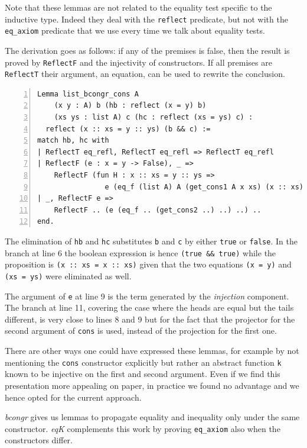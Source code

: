 \documentclass[a4paper,UKenglish,cleveref, autoref]{lipics-v2019}
\newcommand{\derive}[1]{\emph{#1}}
\begin{document}
\noindent
Note that these lemmas are not related to the
equality test specific to the inductive type. Indeed they deal
with the \lstinline+reflect+ predicate, but not with the
\lstinline+eq_axiom+ predicate that we use every time we talk
about equality tests.

The derivation goes as follows: if any of the premises
is false, then the result is proved by
\lstinline+ReflectF+ and the injectivity of constructors.
If all premises are \lstinline+ReflectT+ their argument,
an equation, can be used to rewrite the conclusion.
\begin{lstlisting}[numbers=left]
Lemma list_bcongr_cons A 
    (x y : A) b (hb : reflect (x = y) b)
    (xs ys : list A) c (hc : reflect (xs = ys) c) :
  reflect (x :: xs = y :: ys) (b && c) :=
match hb, hc with
| ReflectT eq_refl, ReflectT eq_refl => ReflectT eq_refl
| ReflectF (e : x = y -> False), _ =>
    ReflectF (fun H : x :: xs = y :: ys =>
                e (eq_f (list A) A (get_cons1 A x xs) (x :: xs) (y :: ys) H))
| _, ReflectF e =>
    ReflectF .. (e (eq_f .. (get_cons2 ..) ..) ..) ..
end.
\end{lstlisting}

\noindent
The elimination of \lstinline+hb+ and \lstinline+hc+
substitutes \lstinline+b+ and \lstinline+c+ 
by either \lstinline+true+ or \lstinline+false+. In the branch
at line 6 the boolean expression is hence \lstinline+(true && true)+
while the proposition is \lstinline+(x :: xs = x :: xs)+ given that
the two equations \lstinline+(x = y)+ and \lstinline+(xs = ys)+
were eliminated as well.

The argument of \lstinline+e+ at line 9
is the term generated by the \derive{injection} component.
The branch at line 11, covering the case where
the heads are equal but the tails different, is very close
to lines 8 and 9 but for the fact that the projector for
the second argument of \lstinline+cons+ is used, instead of the
projection for the first one.

There are other ways one could have expressed these lemmas,
for example by not mentioning the \lstinline+cons+
constructor explicitly but rather an abstract function \lstinline+k+
known to be injective on the first and second argument.
Even if we find this presentation more appealing on paper, in practice
we found no advantage and we hence opted for the current approach.

\derive{bcongr} gives us lemmas to propagate
equality and inequality only under the same constructor.
\derive{eqK} complements this work 
by proving \lstinline+eq_axiom+ also when the constructors differ.
\end{document}
